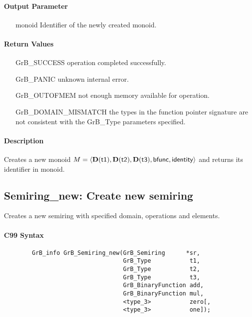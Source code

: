 \paragraph{Output Parameter}

\begin{itemize}[leftmargin=1.1in]
    \item[{\sf monoid}] Identifier of the newly created monoid.
\end{itemize}

\paragraph{Return Values}

\begin{itemize}[leftmargin=2.1in]
\item[{\sf GrB\_SUCCESS}]           operation completed successfully.
\item[{\sf GrB\_PANIC}]             unknown internal error.
\item[{\sf GrB\_OUTOFMEM}]          not enough memory available for operation.
\item[{\sf GrB\_DOMAIN\_MISMATCH}]  the types in the function pointer signature are not   
                                    consistent with the {\sf GrB\_Type} parameters specified.
\end{itemize}

\paragraph{Description}

Creates a new monoid $M = \langle \bold{D}({\sf t1}), \bold{D}({\sf t2}), 
\bold{D}({\sf t3}), {\sf bfunc}, {\sf identity} \rangle$ and
returns its identifier in {\sf monoid}.


\subsection{{\sf Semiring\_new}: Create new semiring}

Creates a new semiring with specified domain, operations and elements.

\paragraph{C99 Syntax}

\begin{verbatim}
        GrB_info GrB_Semiring_new(GrB_Semiring      *sr,
                                  GrB_Type           t1,
                                  GrB_Type           t2,
                                  GrB_Type           t3,
                                  GrB_BinaryFunction add,
                                  GrB_BinaryFunction mul,
                                  <type_3>           zero[,
                                  <type_3>           one]);
\end{verbatim}

